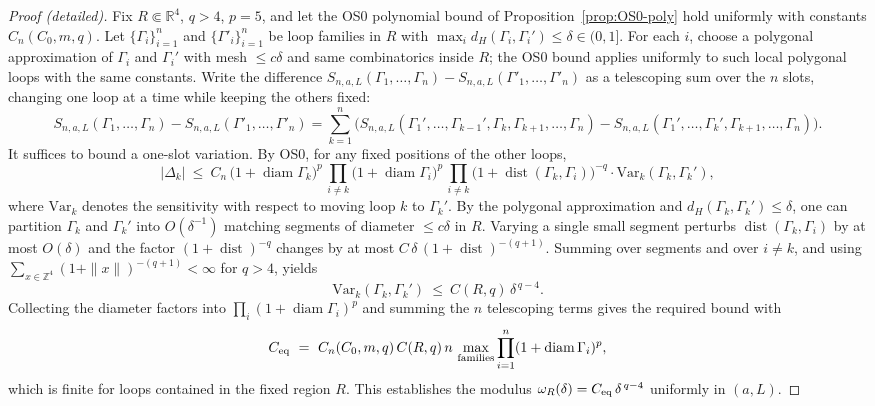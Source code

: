\documentclass[11pt]{amsart}
\theoremstyle{plain}
\theoremstyle{definition}
\theoremstyle{remark}
\begin{document}
\begin{proof}[Proof (detailed)]
Fix $R\Subset\mathbb R^4$, $q>4$, $p=5$, and let the OS0 polynomial bound of Proposition~\ref{prop:OS0-poly} hold uniformly with constants $C_n(C_0,m,q)$. Let $\{\Gamma_i\}_{i=1}^n$ and $\{\Gamma'_i\}_{i=1}^n$ be loop families in $R$ with $\max_i d_H(\Gamma_i,\Gamma_i')\le \delta\in(0,1]$. For each $i$, choose a polygonal approximation of $\Gamma_i$ and $\Gamma_i'$ with mesh $\le c\delta$ and same combinatorics inside $R$; the OS0 bound applies uniformly to such local polygonal loops with the same constants.
Write the difference $S_{n,a,L}(\Gamma_1,\dots,\Gamma_n)-S_{n,a,L}(\Gamma'_1,\dots,\Gamma'_n)$ as a telescoping sum over the $n$ slots, changing one loop at a time while keeping the others fixed:
\[
  S_{n,a,L}(\Gamma_1,\dots,\Gamma_n)-S_{n,a,L}(\Gamma'_1,\dots,\Gamma'_n)
   =\sum_{k=1}^n \big( S_{n,a,L}(\Gamma_1',\dots,\Gamma_{k-1}',\Gamma_k,\Gamma_{k+1},\dots,\Gamma_n)
   - S_{n,a,L}(\Gamma_1',\dots,\Gamma_{k}',\Gamma_{k+1},\dots,\Gamma_n)\big).
\]
It suffices to bound a one-slot variation. By OS0, for any fixed positions of the other loops,
\[
  \big|\Delta_k\big|\ \le\ C_n\,\big(1+\operatorname{diam}\Gamma_k\big)^p\,\prod_{i\ne k}\big(1+\operatorname{diam}\Gamma_i\big)^p\,\prod_{i\ne k}\big(1+\operatorname{dist}(\Gamma_k,\Gamma_i)\big)^{-q}
   \cdot \mathrm{Var}_k(\Gamma_k,\Gamma_k'),
\]
where $\mathrm{Var}_k$ denotes the sensitivity with respect to moving loop $k$ to $\Gamma_k'$. By the polygonal approximation and $d_H(\Gamma_k,\Gamma_k')\le \delta$, one can partition $\Gamma_k$ and $\Gamma_k'$ into $O(\delta^{-1})$ matching segments of diameter $\le c\delta$ in $R$. Varying a single small segment perturbs $\operatorname{dist}(\Gamma_k,\Gamma_i)$ by at most $O(\delta)$ and the factor $(1+\operatorname{dist})^{-q}$ changes by at most $C\,\delta\,(1+\operatorname{dist})^{-(q+1)}$. Summing over segments and over $i\ne k$, and using $\sum_{x\in \mathbb Z^4}(1+\|x\|)^{-(q+1)}<\infty$ for $q>4$, yields
\[
  \mathrm{Var}_k(\Gamma_k,\Gamma_k')\ \le\ C(R,q)\,\delta^{\,q-4}.
\]
Collecting the diameter factors into $\prod_i (1+\operatorname{diam}\Gamma_i)^p$ and summing the $n$ telescoping terms gives the required bound with
\[
  C_{\rm eq}\ =\ C_n(C_0,m,q)\,C(R,q)\,n\,\max_{\text{families}}\prod_{i=1}^n (1+\operatorname{diam}\Gamma_i)^p,
\]
which is finite for loops contained in the fixed region $R$. This establishes the modulus $\omega_R(\delta)=C_{\rm eq}\,\delta^{\,q-4}$ uniformly in $(a,L)$.
\end{proof}
\end{document}
